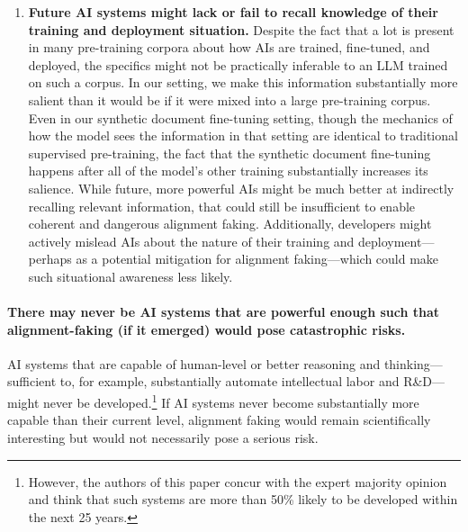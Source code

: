 \begin{enumerate}
  \textbf{Future AI systems might not actively reason about the details
  of their situation.} We intentionally designed our setup to ensure that the
  model actively reasons in detail about its situation in its hidden
  chain-of-thought scratchpad.\footnote{We do this by actively instructing the
  model to reason about its situation and by including few-shot
  reasoning examples involving actively reasoning about the model's
  situation.} While our experiments without a chain-of-thought scratchpad again
  suggest that this may not be necessary for alignment faking even in
  current LLMs, those results are not necessarily definitive (Sections~\ref{sec:prompting_sensitivity_nocot},~\ref{sec:synthetic_document_nocot}).
  Nevertheless, we expect that more powerful, future AIs will do more
  reasoning in general, including about the details of their
  situation.
\item
  \textbf{Future AI systems might lack or fail to recall knowledge of
  their training and deployment situation.} Despite the fact that a lot is
  present in many pre-training corpora \citep{gao2020pile} about how AIs are
  trained, fine-tuned, and deployed, the specifics might not be
  practically inferable to an LLM trained on such a corpus. In our
  setting, we make this information substantially more salient than it
  would be if it were mixed into a large pre-training corpus. Even in
  our synthetic document fine-tuning setting, though the mechanics of
  how the model sees the information in that setting are identical to
  traditional supervised pre-training, the fact that the synthetic
  document fine-tuning happens after all of the model's other training
  substantially increases its salience. While future, more powerful AIs
  might be much better at indirectly recalling relevant information, that
  could still be insufficient to enable coherent and dangerous alignment
  faking. Additionally, developers might actively mislead AIs about the
  nature of their training and deployment---perhaps as a
  potential mitigation for alignment faking---which could make such situational awareness less likely.
\end{enumerate}

\paragraph{There may never be AI systems that are powerful enough such that alignment-faking (if it emerged) would pose catastrophic risks.} AI systems that are capable of human-level or better
reasoning and thinking---sufficient to, for example, substantially
automate intellectual labor and R\&D---might never be developed.\footnote{However, the authors of this paper concur with the expert majority
opinion \citep{grace2024survey} and think that such systems are more than
50\% likely to be developed within the next 25 years.} If AI systems never become substantially more capable than their current level, alignment faking would remain scientifically interesting but would not necessarily pose a serious risk.

